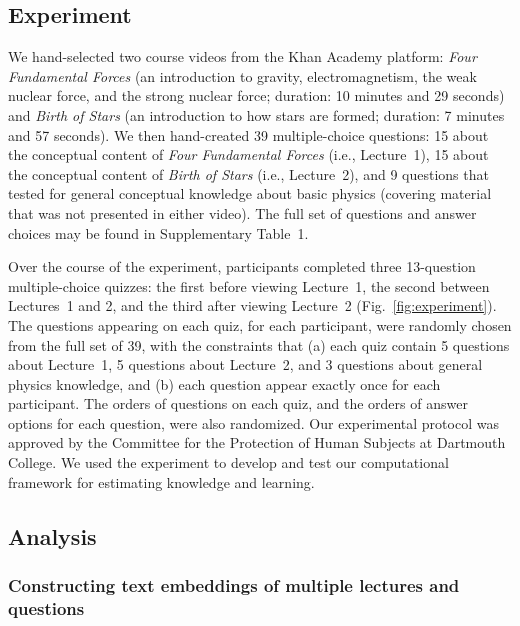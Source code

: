 \documentclass[10pt]{article}
\newcommand{\questions}{1}
\begin{document}
\subsection*{Experiment}\label{subsec:experiment}

We hand-selected two course videos from the Khan Academy platform: \textit{Four
Fundamental Forces} (an introduction to gravity, electromagnetism, the weak
nuclear force, and the strong nuclear force; duration: 10 minutes and 29
seconds) and \textit{Birth of Stars} (an introduction to how stars are formed;
duration: 7 minutes and 57 seconds). We then hand-created 39 multiple-choice
questions: 15 about the conceptual content of \textit{Four Fundamental Forces} (i.e., Lecture~1),
15 about the conceptual content of \textit{Birth of Stars} (i.e., Lecture~2), and 9
questions that tested for general conceptual knowledge about basic physics
(covering material that was not presented in either video). The full set of
questions and answer choices may be found in Supplementary Table~\questions.

Over the course of the experiment, participants completed three 13-question
multiple-choice quizzes: the first before viewing Lecture~1, the second between
Lectures~1 and 2, and the third after viewing Lecture~2
(Fig.~\ref{fig:experiment}). The questions appearing on each quiz, for each
participant, were randomly chosen from the full set of 39, with the constraints
that (a) each quiz contain 5 questions about Lecture~1, 5 questions about
Lecture~2, and 3 questions about general physics knowledge, and (b) each
question appear exactly once for each participant. The orders of questions on
each quiz, and the orders of answer options for each question, were also
randomized. Our experimental protocol was approved by the Committee for the
Protection of Human Subjects at Dartmouth College. We used the experiment to
develop and test our computational framework for estimating knowledge and
learning.

\subsection*{Analysis}

\subsubsection*{Constructing text embeddings of multiple lectures and questions}\label{subsec:topic-modeling}
\end{document}
